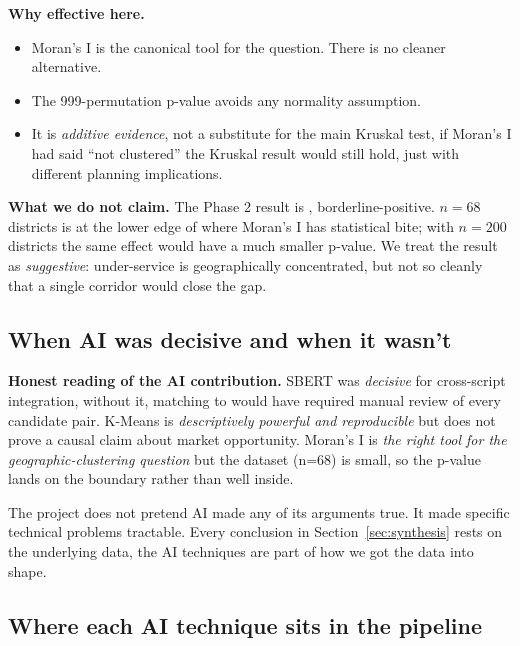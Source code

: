 \textbf{Why effective here.}
\begin{itemize}
 \item Moran's I is the canonical tool for the question. There is no
 cleaner alternative.
 \item The 999-permutation p-value avoids any normality assumption.
 \item It is \emph{additive evidence}, not a substitute for the main
 Kruskal test, if Moran's I had said ``not clustered'' the
 Kruskal result would still hold, just with different planning
 implications.
\end{itemize}

\textbf{What we do not claim.} The Phase 2 result is
, borderline-positive.
$n = 68$ districts is at the lower edge of where Moran's I has
statistical bite; with $n = 200$ districts the same effect would have
a much smaller p-value. We treat the result as \emph{suggestive}:
under-service is geographically concentrated, but not so cleanly that
a single corridor would close the gap.

\subsection{When AI was decisive and when it wasn't}

\begin{callout}
\textbf{\color{plotblue}Honest reading of the AI contribution.}\quad
SBERT was \emph{decisive} for cross-script integration, without it,
matching  to  would have required
manual review of every candidate pair. K-Means is \emph{descriptively
powerful and reproducible} but does not prove a causal claim about
market opportunity. Moran's I is \emph{the right tool for the
geographic-clustering question} but the dataset (n=68) is small, so
the p-value lands on the boundary rather than well inside.

The project does not pretend AI made any of its arguments true. It
made specific technical problems tractable. Every conclusion in
Section~\ref{sec:synthesis} rests on the underlying data, the AI
techniques are part of how we got the data into shape.
\end{callout}

\subsection{Where each AI technique sits in the pipeline}


